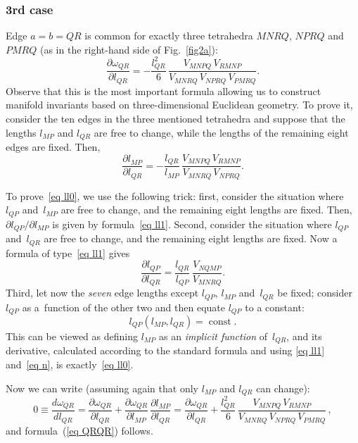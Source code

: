 \documentclass[11pt]{article}
\DeclareMathOperator{\const}{const}
\begin{document}
\subsubsection*{3rd case}
Edge $a=b=QR$ is common for exactly three tetrahedra $MNRQ$, $NPRQ$ and~$PMRQ$ (as in the right-hand side of Fig.~\ref{fig2a}):
\begin{equation}
\frac{\partial \omega_{QR}}{\partial l_{QR}} = -\frac {l_{QR}^2}{6}\, \frac {V_{MNPQ}\,V_{RMNP}}{V_{MNRQ}\,V_{NPRQ}\,V_{PMRQ}}.
\label{eq QRQR}
\end{equation}
Observe that this is the most important formula allowing us to construct manifold invariants based on three-dimensional Euclidean geometry. To prove it, consider the ten edges in the three mentioned tetrahedra and suppose that the lengths $l_{MP}$ and $l_{QR}$ are free to change, while the lengths of the remaining eight edges are f\/ixed. Then,
\begin{equation}
\frac{\partial l_{MP}}{\partial l_{QR}} = -\frac{l_{QR}}{l_{MP}}\, \frac{V_{MNPQ}\,V_{RMNP}}{V_{MNRQ}\, V_{NPRQ}}.
\label{eq ll0}
\end{equation}

To prove~\eqref{eq ll0}, we use the following trick: f\/irst, consider the situation where $l_{QP}$ and~$l_{MP}$ are free to change, and the remaining eight lengths are f\/ixed. Then, $\partial l_{QP} / \partial l_{MP}$ is given by formula~\eqref{eq ll1}. Second, consider the situation where $l_{QP}$ and~$l_{QR}$ are free to change, and the remaining eight lengths are f\/ixed. Now a formula of type~\eqref{eq ll1} gives
\begin{equation}
\frac{\partial l_{QP}}{\partial l_{QR}} = \frac{l_{QR}}{l_{QP}}\, \frac{V_{NQMP}}{V_{MNRQ}}.
\label{eq n}
\end{equation}
Third, let now the \emph{seven} edge lengths except $l_{QP}$, $l_{MP}$ and~$l_{QR}$ be f\/ixed; consider $l_{QP}$ as a~function of the other two and then equate $l_{QP}$ to a constant:
\begin{equation*}
l_{QP}(l_{MP},l_{QR}) = \const .
\end{equation*}
This can be viewed as def\/ining $l_{MP}$ as an \emph{implicit function} of~$l_{QR}$, and its derivative, calculated according to the standard formula and using \eqref{eq ll1} and~\eqref{eq n}, is exactly~\eqref{eq ll0}.

Now we can write (assuming again that only $l_{MP}$ and $l_{QR}$ can change):
\begin{equation*}
0 \equiv \frac{d\omega_{QR}}{dl_{QR}} = \frac{\partial \omega_{QR}}{\partial l_{QR}} + \frac{\partial \omega_{QR}}{\partial l_{MP}}\, \frac{\partial l_{MP}}{\partial l_{QR}} = \frac{\partial \omega_{QR}}{\partial l_{QR}} + \frac {l_{QR}^2}{6}\, \frac{V_{MNPQ}\, V_{RMNP}}{V_{MNRQ}\, V_{NPRQ}\, V_{PMRQ}} \, ,
\end{equation*}
and formula~(\ref{eq QRQR}) follows.
\end{document}
